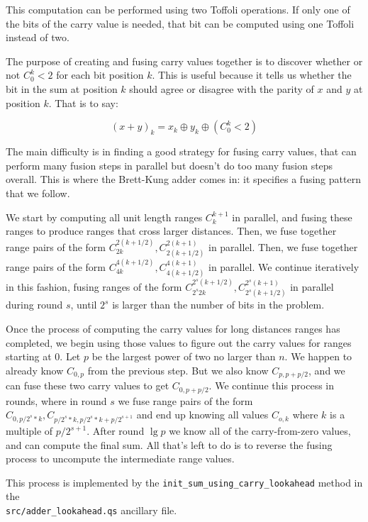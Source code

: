 \documentclass[onecolumn,unpublished]{quantumarticle}
\theoremstyle{definition}
\theoremstyle{definition}
\theoremstyle{definition}
\begin{document}
This computation can be performed using two Toffoli operations.
If only one of the bits of the carry value is needed, that bit can be computed using one Toffoli instead of two.

The purpose of creating and fusing carry values together is to discover whether or not $C_0^k < 2$ for each bit position $k$.
This is useful because it tells us whether the bit in the sum at position $k$ should agree or disagree with the parity of $x$ and $y$ at position $k$.
That is to say:

$$(x + y)_k = x_k \oplus y_k \oplus (C_0^k < 2)$$

The main difficulty is in finding a good strategy for fusing carry values, that can perform many fusion steps in parallel but doesn't do too many fusion steps overall.
This is where the Brett-Kung adder comes in: it specifies a fusing pattern that we follow.

We start by computing all unit length ranges $C_k^{k+1}$ in parallel, and fusing these ranges to produce ranges that cross larger distances.
Then, we fuse together range pairs of the form $C_{2k}^{2(k+1/2)}, C_{2(k+1/2)}^{2(k+1)}$ in parallel.
Then, we fuse together range pairs of the form $C_{4k}^{4(k+1/2)}, C_{4(k+1/2)}^{4(k+1)}$ in parallel.
We continue iteratively in this fashion, fusing ranges of the form $C_{2^s 2k}^{2^s (k+1/2)}, C_{2^s (k+1/2) }^{2^s (k+1)}$ in parallel during round $s$, until $2^s$ is larger than the number of bits in the problem.

Once the process of computing the carry values for long distances ranges has completed, we begin using those values to figure out the carry values for ranges starting at 0.
Let $p$ be the largest power of two no larger than $n$.
We happen to already know $C_{0,p}$ from the previous step.
But we also know $C_{p,p+p/2}$, and we can fuse these two carry values to get $C_{0,p+p/2}$.
We continue this process in rounds, where in round $s$ we fuse range pairs of the form $C_{0,p/2^s*k}, C_{p/2^s*k,p/2^s*k+p/2^{s+1}}$ and end up knowing all values $C_{o,k}$ where $k$ is a multiple of $p/2^{s+1}$.
After round $\lg p$ we know all of the carry-from-zero values, and can compute the final sum.
All that's left to do is to reverse the fusing process to uncompute the intermediate range values.

This process is implemented by the \texttt{init\_sum\_using\_carry\_lookahead} method in the \\\texttt{src/adder\_lookahead.qs} ancillary file.
\end{document}

